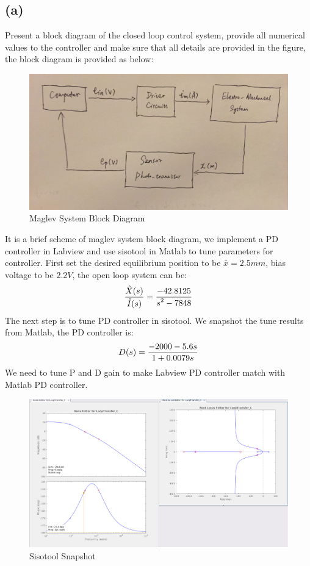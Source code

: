 \documentclass[letterpaper]{article}
\begin{document}
\subsection*{(a)}
Present a block diagram of the closed loop control system, provide all numerical values to the controller and make sure that all details are provided in the figure, the block diagram is provided as below:
\begin{figure}[H]
	\centering
	\includegraphics[scale=0.1]{maglev.jpeg}
	\caption{Maglev System Block Diagram}
\end{figure}
It is a brief scheme of maglev system block diagram, we implement a PD controller in Labview and use sisotool in Matlab to tune parameters for controller. First set the desired equilibrium position to be $\bar{x} = 2.5mm$, bias voltage to be $2.2 V$, the open loop system can be:
$$\frac{\displaystyle \hat{X}(s)}{\displaystyle \hat{I}(s)} = \frac{\displaystyle -42.8125}{\displaystyle s^2 - 7848}$$
The next step is to tune PD controller in sisotool. We snapshot the tune results from Matlab, the PD controller is:
$$D(s) = \frac{\displaystyle -2000-5.6s}{\displaystyle 1+0.0079s}$$
We need to tune P and D gain to make Labview PD controller match with Matlab PD controller.
\begin{figure}[H]
\centering
\includegraphics[scale=0.3]{sisotool.png}
\caption{Sisotool Snapshot }
\end{figure}
\end{document}
